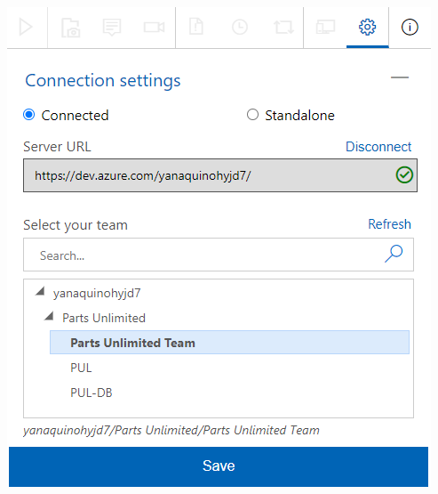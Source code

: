 \begin{itemize}
\begin{center}
\includegraphics[width=\columnwidth]{images/23}\newline
\end{center} 

\end{itemize}

